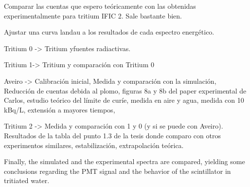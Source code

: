Comparar las cuentas que espero teóricamente con las obtenidas experimentalmente para tritium IFIC 2. Sale bastante bien.

Ajustar una curva landau a los resultados de cada espectro energético.

Tritium 0 -> Tritium yfuentes radiactivas.

Tritium 1-> Tritium y comparación con Tritium 0

Aveiro -> Calibración inicial, Medida y comparación con la simulación, Reducción de cuentas debida al plomo, figuras 8a y 8b del paper experimental de Carlos, estudio teórico del límite de curíe, medida en aire y agua, medida con 10 kBq/L, extensión a mayores tiempos,

Tritium 2 -> Medida y comparación con 1 y 0 (y si se puede con Aveiro). Resultados de la tabla del punto 1.3 de la tesis donde comparo con otros experimentos similares, estabilización, extrapolación teórica.




Finally,
the simulated and the experimental spectra are compared, yielding some conclusions
regarding the PMT signal and the behavior of the scintillator in tritiated water.